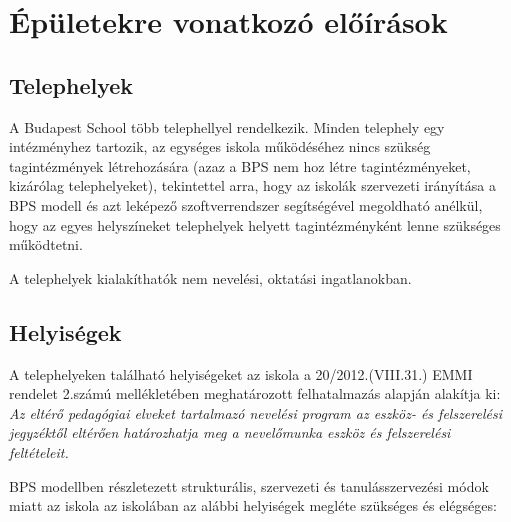 \hypertarget{epuletekre-vonatkozo-eloirasok}{%
\section{Épületekre vonatkozó
előírások}\label{epuletekre-vonatkozo-eloirasok}}

\hypertarget{telephelyek}{%
\subsection{Telephelyek}\label{telephelyek}}

A Budapest School több telephellyel rendelkezik. Minden telephely egy
intézményhez tartozik, az egységes iskola működéséhez nincs szükség
tagintézmények létrehozására (azaz a BPS nem hoz létre tagintézményeket,
kizárólag telephelyeket), tekintettel arra, hogy az iskolák szervezeti
irányítása a BPS modell és azt leképező szoftverrendszer segítségével
megoldható anélkül, hogy az egyes helyszíneket telephelyek helyett
tagintézményként lenne szükséges működtetni.

A telephelyek kialakíthatók nem nevelési, oktatási ingatlanokban.

\hypertarget{helyisegek}{%
\subsection{Helyiségek}\label{helyisegek}}

A telephelyeken található helyiségeket az iskola a 20/2012.(VIII.31.)
EMMI rendelet 2.számú mellékletében meghatározott felhatalmazás alapján
alakítja ki: \emph{Az eltérő pedagógiai elveket tartalmazó nevelési
program az eszköz- és felszerelési jegyzéktől eltérően határozhatja meg
a nevelőmunka eszköz és felszerelési feltételeit.}

BPS modellben részletezett strukturális, szervezeti és tanulásszervezési
módok miatt az iskola az iskolában az alábbi helyiségek megléte
szükséges és elégséges:


